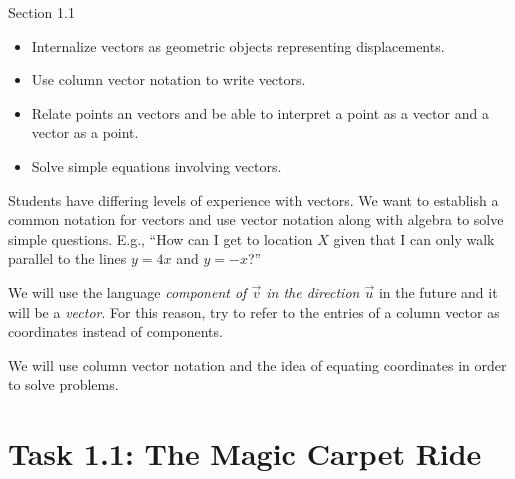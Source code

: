 \documentclass{problemset}
\begin{document}
\begin{lesson}

	 Section 1.1

	\begin{itemize}
		\item Internalize vectors as geometric objects representing displacements.

		\item Use column vector notation to write vectors.

		\item Relate points an vectors and be able to interpret a point as
			a vector and a vector as a point.

		\item Solve simple equations involving vectors.
	\end{itemize}

	 Students have differing levels of experience with vectors.
	We want to establish a common notation for vectors and use vector notation
	along with algebra to solve simple questions. E.g., ``How can I get to location
	$X$ given that I can only walk parallel to the lines $y=4x$ and $y=-x$?''


	\begin{annotation}
		\begin{notes}
			We will use the language \emph{component of $\vec v$ in
			the direction $\vec u$} in the future and it will be a \emph{vector}.
			For this reason, try to refer to the entries of a column
			vector as coordinates instead of components.
		\end{notes}
	\end{annotation}We will use column vector notation and the idea of equating
	coordinates in order to solve problems.

	\newpage
\end{lesson}

\setcounter{page}{1}
\pagestyle{iola}
\section*{Task 1.1: The Magic Carpet Ride}
\end{document}
